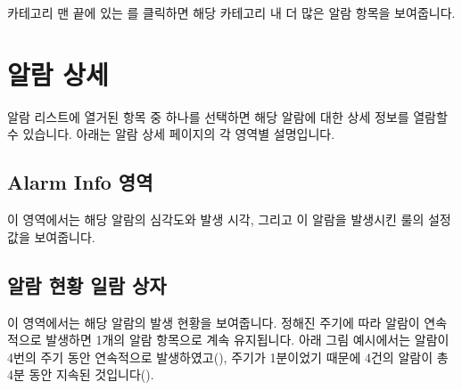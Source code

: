 \documentclass[letterpaper,10pt,english]{sphinxmanual}
\begin{document}
카테고리 맨 끝에 있는 를 클릭하면 해당 카테고리 내 더 많은 알람 항목을 보여줍니다.
\begin{quote}

\begin{figure}[H]
\centering

\noindent{}
\end{figure}
\end{quote}


\section{알람 상세}
\label{\detokenize{anomaly/part05/index:alarm-details}}\label{\detokenize{anomaly/part05/index:id3}}
알람 리스트에 열거된 항목 중 하나를 선택하면 해당 알람에 대한 상세 정보를 열람할 수 있습니다. 아래는 알람 상세 페이지의 각 영역별 설명입니다.


\subsection{Alarm Info 영역}
\label{\detokenize{anomaly/part05/index:alarm-info}}
이 영역에서는 해당 알람의 심각도와 발생 시각, 그리고 이 알람을 발생시킨 룰의 설정값을 보여줍니다.
\begin{quote}

\begin{figure}[H]
\centering

\noindent{}
\end{figure}
\end{quote}


\subsection{알람 현황 일람 상자}
\label{\detokenize{anomaly/part05/index:id4}}
이 영역에서는 해당 알람의 발생 현황을 보여줍니다. 정해진 주기에 따라 알람이 연속적으로 발생하면 1개의 알람 항목으로 계속 유지됩니다. 아래 그림 예시에서는 알람이 4번의 주기 동안 연속적으로 발생하였고(), 주기가 1분이었기 때문에 4건의 알람이 총 4분 동안 지속된 것입니다().
\begin{quote}

\begin{figure}[H]
\centering

\noindent{}
\end{figure}
\end{quote}
\end{document}
